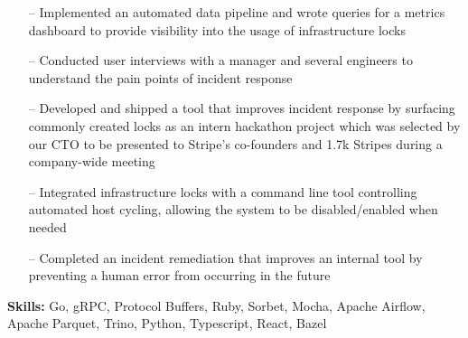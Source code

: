 \documentclass[9pt,a4paper]{altacv}
\begin{document}
\tagline{}

\begin{fullwidth}
    \makecvheader
\end{fullwidth}






\begin{itemize}
    \setlength{\itemindent}{0.5em}
    \item[--] Implemented an automated data pipeline and wrote queries for a metrics dashboard to provide visibility into the usage of infrastructure locks
    \item[--] Conducted user interviews with a manager and several engineers to understand the pain points of incident response
    \item[--] Developed and shipped a tool that improves incident response by surfacing commonly created locks as an intern hackathon project which was selected by our CTO to be presented to Stripe's co-founders and 1.7k Stripes during a company-wide meeting
    \item[--] Integrated infrastructure locks with a command line tool controlling automated host cycling, allowing the system to be disabled/enabled when needed
    \item[--] Completed an incident remediation that improves an internal tool by preventing a human error from occurring in the future
\end{itemize}
\smallskip
\textbf{Skills:} Go, gRPC, Protocol Buffers, Ruby, Sorbet, Mocha, Apache Airflow, Apache Parquet, Trino, Python, Typescript, React, Bazel

\divider
\end{document}
